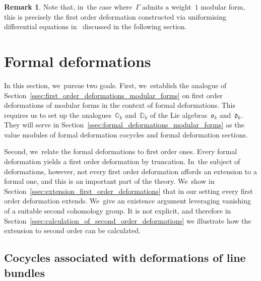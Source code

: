 \documentclass[10pt,a4paper]{article}
\numberwithin{equation}{section}
\theoremstyle{plain}
\theoremstyle{definition}
\newtheorem{remark}[theoremcounter]{Remark}
\newcommand{\bbD}{\ensuremath{\mathbb{D}}}
\newcommand{\bbO}{\ensuremath{\mathbb{O}}}
\newcommand{\frakd}{\ensuremath{\mathfrak{d}}}
\newcommand{\frako}{\ensuremath{\mathfrak{o}}}
\let\Ga\Gamma
\begin{document}
\begin{remark}
Note that, in~the case where~$\Ga$ admits a weight~$1$ modular form, this is precisely the first order deformation constructed via uniformising differential equations in~\cite{bogo21} discussed in the following section.
\end{remark}


\section{Formal deformations}
\label{sec:formal_deformations}

In this section, we~pursue two goals. First, we~establish the analogue of Section~\ref{ssec:first_order_deformations_modular_forms} on first order deformations of modular forms in the context of formal deformations. This requires us to set up the analogues~$\bbO_k$ and~$\bbD_k$ of the Lie algebras~$\frako_k$ and~$\frakd_k$. They will serve in Section~\ref{ssec:formal_deformations_modular_forms} as the value modules of formal deformation cocycles and formal deformation sections.

Second, we~relate the formal deformations to first order ones. Every formal deformation yields a first order deformation by truncation. In~the subject of deformations, however, not every first order deformation affords an extension to a formal one, and this is an important part of the theory. We~show in Section~\ref{ssec:extension_first_order_deformations} that in our setting every first order deformation extends. We~give an existence argument leveraging vanishing of a suitable second cohomology group. It is not explicit, and therefore in Section~\ref{ssec:calculation_of_second_order_deformations} we illustrate how the extension to second order can be calculated.

\subsection{Cocycles associated with deformations of line bundles}
\label{ssec:formal_cocycles_line_bundle}
\end{document}
